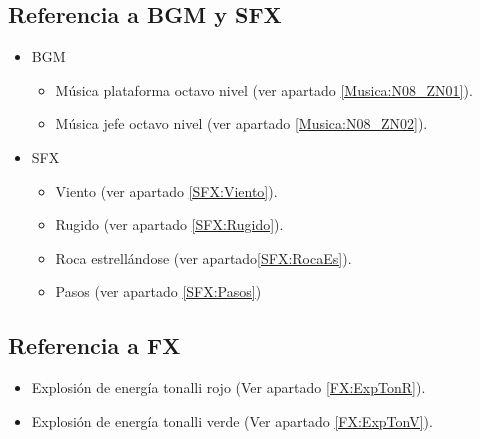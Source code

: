 	\subsection{Referencia a BGM y SFX}
	\begin{itemize}
	\item BGM
		\begin{itemize}
				\item Música plataforma octavo nivel (ver apartado \ref{Musica:N08_ZN01}).
				\item Música jefe octavo nivel (ver apartado \ref{Musica:N08_ZN02}).
			\end{itemize}
		\item SFX
		\begin{itemize}
			\item Viento (ver apartado \ref{SFX:Viento}).
			\item Rugido (ver apartado \ref{SFX:Rugido}).
			\item Roca estrellándose (ver apartado\ref{SFX:RocaEs}).
			\item Pasos (ver apartado \ref{SFX:Pasos})
		\end{itemize}
\end{itemize} 

	\subsection{Referencia a FX}
\begin{itemize}
	\item Explosión de energía tonalli rojo (Ver apartado \ref{FX:ExpTonR}).
	\item Explosión de energía tonalli verde (Ver apartado \ref{FX:ExpTonV}).
\end{itemize}
	